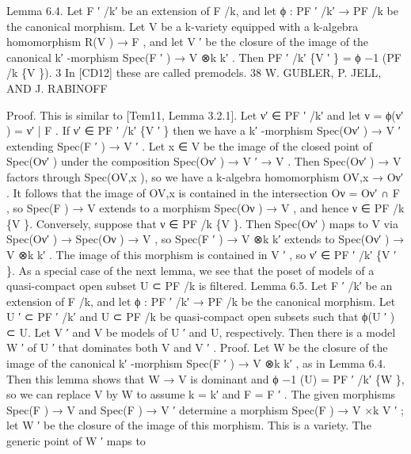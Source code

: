 \documentclass[
  10pt,
]{article}
\newenvironment{Shaded}{}{}
\newcommand{\NormalTok}[1]{#1}
\begin{document}
\begin{Shaded}
\begin{Highlighting}[]

\NormalTok{Lemma 6.4. Let F ′ /k′ be an extension of F /k, and let ϕ : PF ′ /k′ → PF /k be the canonical}
\NormalTok{morphism. Let V be a k{-}variety equipped with a k{-}algebra homomorphism R(V ) → F , and}
\NormalTok{let V ′ be the closure of the image of the canonical k′ {-}morphism Spec(F ′ ) → V ⊗k k′ . Then}
\NormalTok{PF ′ /k′ \{V ′ \} = ϕ −1 (PF /k \{V \}).}
\NormalTok{   3}
\NormalTok{    In [CD12] these are called premodels.}
\NormalTok{38                             W. GUBLER, P. JELL, AND J. RABINOFF}

\NormalTok{Proof. This is similar to [Tem11, Lemma 3.2.1]. Let ν′ ∈ PF ′ /k′ and let ν = ϕ(ν′ ) = ν′ | F .}
\NormalTok{If ν′ ∈ PF ′ /k′ \{V ′ \} then we have a k′ {-}morphism Spec(Oν′ ) → V ′ extending Spec(F ′ ) →}
\NormalTok{V ′ . Let x ∈ V be the image of the closed point of Spec(Oν′ ) under the composition}
\NormalTok{Spec(Oν′ ) → V ′ → V . Then Spec(Oν′ ) → V factors through Spec(OV,x ), so we have a}
\NormalTok{k{-}algebra homomorphism OV,x → Oν′ . It follows that the image of OV,x is contained in the}
\NormalTok{intersection Oν = Oν′ ∩ F , so Spec(F ) → V extends to a morphism Spec(Oν ) → V , and}
\NormalTok{hence ν ∈ PF /k \{V \}. Conversely, suppose that ν ∈ PF /k \{V \}. Then Spec(Oν′ ) maps to V via}
\NormalTok{Spec(Oν′ ) → Spec(Oν ) → V , so Spec(F ′ ) → V ⊗k k′ extends to Spec(Oν′ ) → V ⊗k k′ . The}
\NormalTok{image of this morphism is contained in V ′ , so ν′ ∈ PF ′ /k′ \{V ′ \}.                      }
\NormalTok{  As a special case of the next lemma, we see that the poset of models of a quasi{-}compact}
\NormalTok{open subset U ⊂ PF /k is filtered.}
\NormalTok{Lemma 6.5. Let F ′ /k′ be an extension of F /k, and let ϕ : PF ′ /k′ → PF /k be the canonical}
\NormalTok{morphism. Let U ′ ⊂ PF ′ /k′ and U ⊂ PF /k be quasi{-}compact open subsets such that ϕ(U ′ ) ⊂ U.}
\NormalTok{Let V ′ and V be models of U ′ and U, respectively. Then there is a model W ′ of U ′ that}
\NormalTok{dominates both V and V ′ .}
\NormalTok{Proof. Let W be the closure of the image of the canonical k′ {-}morphism Spec(F ′ ) → V ⊗k k′ ,}
\NormalTok{as in Lemma 6.4. Then this lemma shows that W → V is dominant and ϕ −1 (U) =}
\NormalTok{PF ′ /k′ \{W \}, so we can replace V by W to assume k = k′ and F = F ′ . The given morphisms}
\NormalTok{Spec(F ) → V and Spec(F ) → V ′ determine a morphism Spec(F ) → V ×k V ′ ; let W ′ be the}
\NormalTok{closure of the image of this morphism. This is a variety. The generic point of W ′ maps to}

\end{Highlighting}
\end{Shaded}
\end{document}
